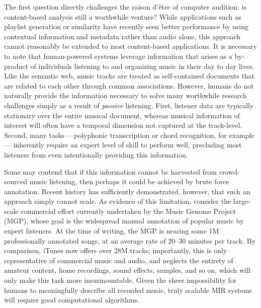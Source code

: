 The first question directly challenges the raison d'\^etre of computer audition: is content-based analysis still a worthwhile venture?
While applications such as playlist generation \cite{McFee2012} or similarity \cite{Levy2009} have recently seen better performance by using contextual information and metadata rather than audio alone, this approach cannot reasonably be extended to most content-based applications.
It is necessary to note that human-powered systems leverage information that arises as a by-product of individuals listening to and organizing music in their day to day lives.
Like the semantic web, music tracks are treated as self-contained documents that are related to each other through common associations.
However, humans do not naturally provide the information necessary to solve many worthwhile research challenges simply as a result of \emph{passive} listening.
First, listener data are typically stationary over the entire musical document, whereas musical information of interest will often have a temporal dimension not captured at the track-level.
Second, many tasks ---polyphonic transcription or chord recognition, for example--- inherently require an expert level of skill to perform well, precluding most listeners from even intentionally providing this information.

Some may contend that if this information cannot be harvested from crowd-sourced music listening, then perhaps it could be achieved by brute force annotation.
Recent history has sufficiently demonstrated, however, that such an approach simply cannot scale.
As evidence of this limitation, consider the large-scale commercial effort currently undertaken by the Music Genome Project (MGP), whose goal is the widespread manual annotation of popular music by expert listeners.
At the time of writing, the MGP is nearing some 1M professionally annotated songs, at an average rate of 20--30 minutes per track.
By comparison, iTunes now offers over 28M tracks; importantly, this is only representative of commercial music and audio, and neglects the entirety of amateur content, home recordings, sound effects, samples, and so on, which will only make this task more insurmountable. 
Given the sheer impossibility for humans to meaningfully describe all recorded music, truly scalable MIR systems will require good computational algorithms.

